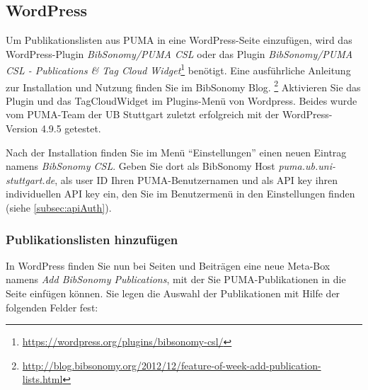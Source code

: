 \subsection{WordPress}
\label{subsec:wordpress}
Um Publikationslisten aus PUMA in eine WordPress-Seite einzufügen, wird das WordPress-Plugin \textit{BibSonomy/PUMA CSL} oder das Plugin \textit{BibSonomy/PUMA CSL - Publications \& Tag Cloud Widget}\footnote{\url{https://wordpress.org/plugins/bibsonomy-csl/}} benötigt. Eine ausführliche Anleitung zur Installation und Nutzung finden Sie im BibSonomy Blog. \footnote{\url{http://blog.bibsonomy.org/2012/12/feature-of-week-add-publication-lists.html}} Aktivieren Sie das Plugin und das TagCloudWidget im Plugins-Menü von Wordpress. Beides wurde vom PUMA-Team der UB Stuttgart zuletzt erfolgreich mit der WordPress-Version 4.9.5 getestet.

Nach der Installation finden Sie im Menü \enquote{Einstellungen} einen neuen Eintrag namens \textit{BibSonomy CSL}. Geben Sie dort als BibSonomy Host \textit{puma.ub.uni-stuttgart.de}, als user ID Ihren PUMA-Benutzernamen und als API key ihren individuellen API key ein, den Sie im Benutzermenü in den Einstellungen finden (siehe \autoref{subsec:apiAuth}).  

\subsubsection*{Publikationslisten hinzufügen}
\label{sss:wordpressPublist}

In WordPress finden Sie nun bei Seiten und Beiträgen eine neue Meta-Box namens \textit{Add BibSonomy Publications}, mit der Sie PUMA-Publikationen in die Seite einfügen können. Sie legen die Auswahl der Publikationen mit Hilfe der folgenden Felder fest:

